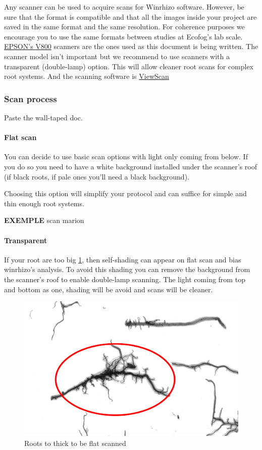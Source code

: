 \documentclass[
  12pt,
  american,
  a4paper,
  extrafontsizes,onecolumn,openright
  ]{memoir}
\begin{document}
Any scanner can be used to acquire scans for Winrhizo software. However, be sure that the format is compatible and that all the images inside your project are saved in the same format and the same resolution. For coherence purposes we encourage you to use the same formats between studies at Ecofog's lab scale.
\href{document/machine/EPSON_V800/test.txt}{EPSON's V800} scanners are the ones used as this document is being written. The scanner model isn't important but we recommend to use scanners with a transparent (double-lamp) option. This will allow cleaner root scans for complex root systems.
And the scanning software is \href{document/software/Viewscan/test.txt}{ViewScan}

\hypertarget{scan-process}{%
\subsubsection{Scan process}\label{scan-process}}

Paste the wall-taped doc.

\hypertarget{flat-scan}{%
\paragraph{Flat scan}\label{flat-scan}}

You can decide to use basic scan options with light only coming from below. If you do so you need to have a white background installed under the scanner's roof (if black roots, if pale ones you'll need a black background).

Choosing this option will simplify your protocol and can suffice for simple and thin enough root systems.

\textbf{EXEMPLE} scan marion

\hypertarget{transparent}{%
\paragraph{Transparent}\label{transparent}}

If your root are too big \ref{fig:bigroots}, then self-shading can appear on flat scan and bias winrhizo's analysis. To avoid this shading you can remove the background from the scanner's roof to enable double-lamp scanning. The light coming from top and bottom as one, shading will be avoid and scans will be cleaner.

\scriptsize

\begin{figure}

{\centering \includegraphics[width=0.5\linewidth]{document/trait/rootmorpho/thickroot} 

}

\caption{Roots to thick to be flat scanned}\label{fig:bigroots}
\end{figure}
\end{document}
